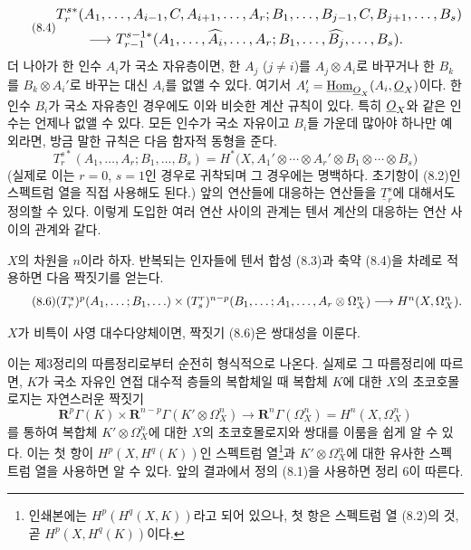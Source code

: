 \begin{equation}\tag{8.4}
\resizebox{\textwidth}{!}{$
\begin{aligned}
&T_{r}^{s*}(A_1,\ldots,A_{i-1},C,A_{i+1},\ldots,A_r;
 B_1,\ldots,B_{j-1},C,B_{j+1},\ldots,B_s)\\
&\qquad\longrightarrow
T_{r-1}^{s-1*}(A_1,\ldots,\widehat{A_i},\ldots,A_r;
 B_1,\ldots,\widehat{B_j},\ldots,B_s).
\end{aligned}
$}
\end{equation}
더 나아가 한 인수 $A_i$가 국소 자유층이면, 한 $A_j$ ($j\neq i$)를
$A_j\otimes A_i$로 바꾸거나 한 $B_k$를 $B_k\otimes A_i'$로 바꾸는 대신
$A_i$를 없앨 수 있다. 여기서
$A_i'=\underline{\operatorname{Hom}}_{\underline{O}_X}(A_i,\underline{O}_X)$이다. 한 인수 $B_i$가 국소 자유층인
경우에도 이와 비슷한 계산 규칙이 있다. 특히 $\underline{O}_X$와 같은 인수는
언제나 없앨 수 있다. 모든 인수가 국소 자유이고 $B_i$들 가운데 많아야
하나만 예외라면, 방금 말한 규칙은 다음 함자적 동형을 준다.
\begin{equation}\tag{8.5}
  T_{r}^{s*}(A_1,\ldots,A_r;B_1,\ldots,B_s)
  =H^{*}\bigl(X,A_1'\otimes\cdots\otimes A_r'
    \otimes B_1\otimes\cdots\otimes B_s\bigr)
\end{equation}
(실제로 이는 $r=0$, $s=1$인 경우로 귀착되며 그 경우에는 명백하다.
초기항이 (8.2)인 스펙트럼 열을 직접 사용해도 된다.) 앞의 연산들에
대응하는 연산들을 $\underline{T}_{r}^{s}$에 대해서도 정의할 수 있다.
이렇게 도입한 여러 연산 사이의 관계는 텐서 계산의 대응하는 연산 사이의
관계와 같다.

$X$의 차원을 $n$이라 하자. 반복되는 인자들에 텐서 합성 (8.3)과
축약 (8.4)을 차례로 적용하면 다음 짝짓기를 얻는다.
\begin{equation}\tag{8.6}
\resizebox{\textwidth}{!}{$
  (T_{r}^{s})^{p}(A_1,\ldots;B_1,\ldots)
  \times
  (T_{s}^{r})^{n-p}(B_1,\ldots;A_1,\ldots,A_r\otimes\Omega_X^{n})
  \longrightarrow H^{n}(X,\Omega_X^{n}).
$}
\end{equation}

 $X$가 비특이 사영 대수다양체이면, 짝짓기 (8.6)은
쌍대성을 이룬다.

이는 제3정리의 따름정리로부터 순전히 형식적으로 나온다. 실제로 그
따름정리에 따르면, $K$가 국소 자유인 연접 대수적 층들의 복합체일 때
복합체 $K$에 대한 $X$의 초코호몰로지는 자연스러운 짝짓기
\begin{equation}\tag{8.7}
  \mathbf R^{p}\Gamma(K)
  \times\mathbf R^{n-p}\Gamma(K'\otimes\Omega_X^{n})
  \longrightarrow\mathbf R^{n}\Gamma(\Omega_X^{n})
  =H^{n}(X,\Omega_X^{n})
\end{equation}
를 통하여 복합체 $K'\otimes\Omega_X^{n}$에 대한 $X$의 초코호몰로지와
쌍대를 이룸을 쉽게 알 수 있다. 이는 첫 항이
$H^{p}(X,H^{q}(K))$인 스펙트럼 열\footnote{인쇄본에는
$H^{p}(H^{q}(X,K))$라고 되어 있으나, 첫 항은 스펙트럼 열 (8.2)의
것, 곧 $H^{p}(X,H^{q}(K))$이다.}과
$K'\otimes\Omega_X^{n}$에 대한 유사한 스펙트럼 열을 사용하면 알 수
있다. 앞의 결과에서 정의 (8.1)을 사용하면 정리 6이 따른다.

